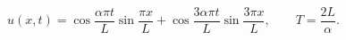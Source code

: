 \[u(x,t)=\cos\frac{\alpha\pi t}{L}\sin\frac{\pi x}{L}+\cos\frac{3\alpha\pi t}{L}\sin\frac{3\pi x}{L},\qquad T=\frac{2L}{\alpha}.\]
